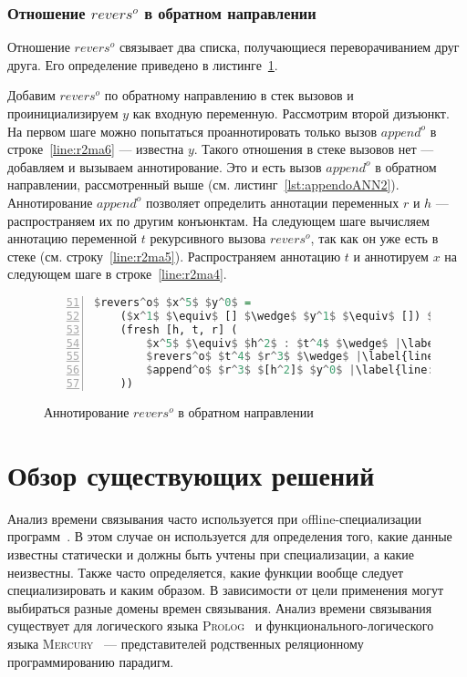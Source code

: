 \documentclass[conference,a4paper,american,russian]{IEEEtran}
\newcommand{\mercury}{\textsc{Mercury}}
\newcommand{\prolog}{\textsc{Prolog}}
\begin{document}
\subsubsection{Отношение $revers^o$ в обратном направлении}

Отношение $revers^o$ связывает два списка, получающиеся переворачиванием друг друга.
Его определение приведено в листинге~\ref{lst:reversoANN2}.

Добавим $revers^o$ по обратному направлению в стек вызовов и проинициализируем $y$ как входную переменную.
Рассмотрим второй дизъюнкт.
На первом шаге можно попытаться проаннотировать только вызов $append^o$ в строке~\ref{line:r2ma6} --- известна $y$.
Такого отношения в стеке вызовов нет --- добавляем и вызываем аннотирование.
Это и есть вызов $append^o$ в обратном направлении, рассмотренный выше (см. листинг~\ref{lst:appendoANN2}).
Аннотирование $append^o$ позволяет определить аннотации переменных $r$ и $h$ --- распространяем их по другим конъюнктам.
На следующем шаге вычисляем аннотацию переменной $t$ рекурсивного вызова $revers^o$, так как он уже есть в стеке (см. строку~\ref{line:r2ma5}).
Распространяем аннотацию $t$ и аннотируем $x$ на следующем шаге в строке~\ref{line:r2ma4}.

\begin{figure}[h!]
  \begin{center}
  \begin{minipage}{0.32\textwidth}
  \begin{lstlisting}[language=Haskell, frame=single, numbers=left,numberstyle=\small, firstnumber=51, escapechar=|]
  $revers^o$ $x^5$ $y^0$ =
    ($x^1$ $\equiv$ [] $\wedge$ $y^1$ $\equiv$ []) $\vee$ |\label{line:r2ma2}|
    (fresh [h, t, r] (
        $x^5$ $\equiv$ $h^2$ : $t^4$ $\wedge$ |\label{line:r2ma4}|
        $revers^o$ $t^4$ $r^3$ $\wedge$ |\label{line:r2ma5}|
        $append^o$ $r^3$ $[h^2]$ $y^0$ |\label{line:r2ma6}|
    ))
    \end{lstlisting}
  \end{minipage}
  \end{center}
  \caption{Аннотирование $revers^o$ в обратном направлении}
  \label{lst:reversoANN2}
\end{figure}

\section{Обзор существующих решений}\label{related}

Анализ времени связывания часто используется при offline-специализации программ~\cite{jones1993partial}. 
В этом случае он используется для определения того, какие данные известны статически и должны быть учтены при специализации, а какие неизвестны. 
Также часто определяется, какие функции вообще следует специализировать и каким образом. 
В зависимости от цели применения могут выбираться разные домены времен связывания.
Анализ времени связывания существует для логического языка \prolog{}~\cite{leuschel2004prolog} и функционального-логического языка \mercury{}~\cite{vanhoof2004binding} --- представителей родственных реляционному программированию парадигм.
\end{document}
